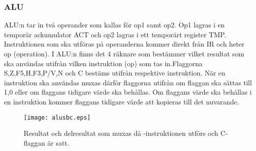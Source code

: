 \documentclass[main.tex]{subfiles}
\begin{document}
\subsubsection{ALU}
 ALU:n tar in två operander som kallas för op1 samt op2. Op1 lagras i en
 temporär ackumulator ACT och op2 lagras i ett temporärt register TMP.
 Instruktionen som ska utföras på operanderna kommer direkt från IR och heter
 op (operation). I ALU:n finns det 4 räknare som bestämmer vilket resultat som
 ska användas utifrån vilken instruktion (op) som tas in.Flaggorna
 S,Z,F5,H,F3,P/V,N och C bestäms utifrån respektive instruktion. När en
 instruktion ska användas muxas därför flaggorna utifrån om flaggan ska sättas
 till 1,0 eller om flaggans tidigare värde ska behållas. Om flaggans värde ska
 behållas i en instruktion kommer flaggans tidigare värde att kopieras till det
 nuvarande.

\begin{figure}[H]
    \center
    \texttt{[image: alusbc.eps]}
    \caption{Resultat och delresultat som muxas då -instruktionen
    utförs och C-flaggan är satt.}
\end{figure}
\end{document}
